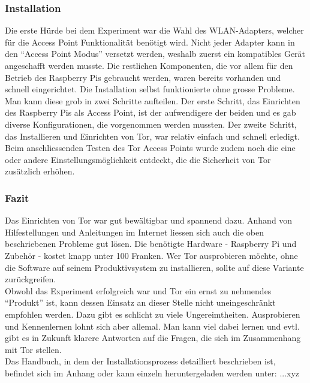 \subsubsection{Installation}
Die erste Hürde bei dem Experiment war die Wahl des WLAN-Adapters, welcher für die Access Point Funktionalität benötigt wird. Nicht jeder Adapter kann in den ``Access Point Modus'' versetzt werden, weshalb zuerst ein kompatibles Gerät angeschafft werden musste. Die restlichen Komponenten, die vor allem für den Betrieb des Raspberry Pis gebraucht werden, waren bereits vorhanden und schnell eingerichtet. Die Installation selbst funktionierte ohne grosse Probleme. Man kann diese grob in zwei Schritte aufteilen. Der erste Schritt, das Einrichten des Raspberry Pis als Access Point, ist der aufwendigere der beiden und es gab diverse Konfigurationen, die vorgenommen werden mussten. Der zweite Schritt, das Installieren und Einrichten von Tor, war relativ einfach und schnell erledigt. Beim anschliessenden Testen des Tor Access Points wurde zudem noch die eine oder andere Einstellungsmöglichkeit entdeckt, die die Sicherheit von Tor zusätzlich erhöhen.

\subsubsection{Fazit}
Das Einrichten von Tor war gut bewältigbar und spannend dazu. Anhand von Hilfestellungen und Anleitungen im Internet liessen sich auch die oben beschriebenen Probleme gut lösen. Die benötigte Hardware - Raspberry Pi und Zubehör - kostet knapp unter 100 Franken. Wer Tor ausprobieren möchte, ohne die Software auf seinem Produktivsystem zu installieren, sollte auf diese Variante zurückgreifen.
\\
Obwohl das Experiment erfolgreich war und Tor ein ernst zu nehmendes ``Produkt'' ist, kann dessen Einsatz an dieser Stelle nicht uneingeschränkt empfohlen werden. Dazu gibt es schlicht zu viele Ungereimtheiten. Ausprobieren und Kennenlernen lohnt sich aber allemal. Man kann viel dabei lernen und evtl. gibt es in Zukunft klarere Antworten auf die Fragen, die sich im Zusammenhang mit Tor stellen.
\\
Das Handbuch, in dem der Installationsprozess detailliert beschrieben ist, befindet sich im Anhang oder kann einzeln heruntergeladen werden unter: ...xyz
